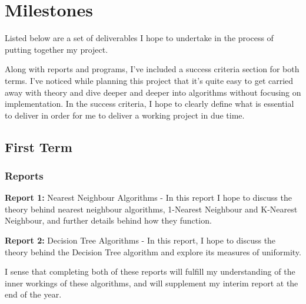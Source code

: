 \documentclass[report,10pt]{article}
\begin{document}
\pagebreak


\section{Milestones}
Listed below are a set of deliverables I hope to undertake in the process of putting together my project. \par 
Along with reports and programs, I've included a success criteria section for both terms. I've noticed while planning this project that it's quite easy to get carried away with theory and dive deeper and deeper into algorithms without focusing on implementation. In the success criteria, I hope to clearly define what is essential to deliver in order for me to deliver a working project in due time. 
\subsection{First Term}
\subsubsection{Reports}
\textbf{Report 1:} Nearest Neighbour Algorithms - In this report I hope to discuss the theory behind nearest neighbour algorithms, 1-Nearest Neighbour and K-Nearest Neighbour, and further details behind how they function. \par 
\noindent \textbf{Report 2:} Decision Tree Algorithms - In this report, I hope to discuss the theory behind the Decision Tree algorithm and explore its measures of uniformity. \par
\vspace{2mm}
I sense that completing both of these reports will fulfill my understanding of the inner workings of these algorithms, and will supplement my interim report at the end of the year. \par
\end{document}
